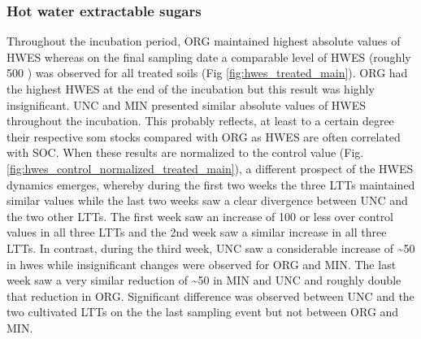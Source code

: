 		\subsubsection{Hot water extractable sugars}
			Throughout the incubation period, ORG maintained highest absolute values of HWES whereas on the final sampling date a comparable level of HWES (roughly 500 \genericunit) was observed for all treated soils (Fig \ref{fig:hwes_treated_main}). ORG  had the highest HWES at the end of the incubation but this result was highly insignificant. UNC and MIN presented similar absolute values of HWES throughout the incubation. This probably reflects, at least to a certain degree their respective \gls{som} stocks compared with ORG as HWES are often correlated with SOC.
			When these results are normalized to the control value (Fig. \ref{fig:hwes_control_normalized_treated_main}), a different prospect of the HWES dynamics emerges, whereby during the first two weeks the three LTTs maintained similar values while the last two weeks saw a clear divergence between UNC and the two other LTTs. The first week saw an increase of 100 \genericunit or less over control values in all three LTTs and the 2nd week saw a similar increase in all three LTTs. In contrast, during the third week, UNC saw a considerable increase of \~{}50 \genericunit in \gls{hwes} while insignificant changes were observed for ORG and MIN. The last week saw a very similar reduction of \~{}50 \genericunit in MIN and UNC and roughly double that reduction in ORG. Significant difference was observed between UNC and the two cultivated LTTs on the the last sampling event but not between ORG and MIN.

